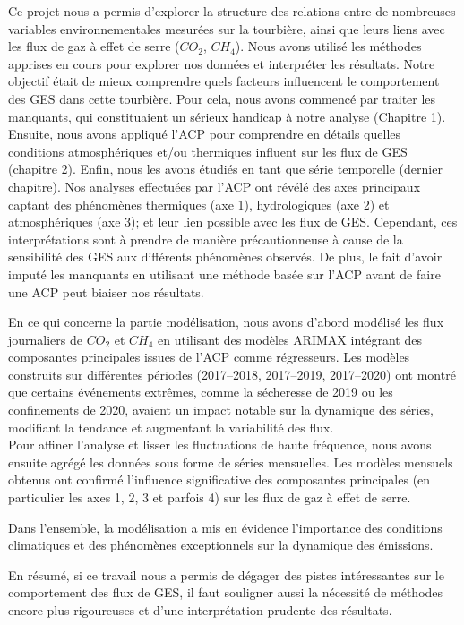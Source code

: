 \documentclass[a4paper,12pt]{report}%
\begin{document}
Ce projet nous a permis d’explorer la structure des relations entre de nombreuses variables environnementales mesurées sur la tourbière, ainsi que leurs liens avec les flux de gaz à effet de serre ($CO_2$, $CH_4$). 
Nous avons utilisé les méthodes apprises en cours pour explorer nos données et interpréter les résultats.
Notre objectif était de mieux comprendre quels facteurs influencent le comportement des GES dans cette tourbière.
Pour cela, nous avons commencé par traiter  les manquants, qui constituaient  un sérieux handicap à notre analyse (Chapitre 1). Ensuite, nous avons appliqué l'ACP pour comprendre en détails quelles conditions atmosphériques et/ou thermiques influent sur les flux de GES (chapitre 2). Enfin, nous les avons étudiés en tant que série temporelle (dernier chapitre). \newline
Nos analyses effectuées par l'ACP ont révélé des axes principaux captant des phénomènes thermiques (axe 1), hydrologiques (axe 2) et atmosphériques (axe 3); et leur lien possible avec les flux de GES. Cependant, ces interprétations sont à prendre de manière précautionneuse  à cause de la sensibilité des GES aux différents phénomènes observés. De plus, le fait d'avoir imputé les manquants en utilisant une méthode basée sur l'ACP avant de faire une ACP peut biaiser nos résultats.\newline

En ce qui concerne la partie modélisation, nous avons d’abord modélisé les flux journaliers de $CO_2$ et $CH_4$ en utilisant des modèles ARIMAX intégrant des composantes principales issues de l’ACP comme régresseurs.   Les modèles construits sur différentes périodes (2017–2018, 2017–2019, 2017–2020) ont montré que certains événements extrêmes, comme la sécheresse de 2019 ou les confinements de 2020, avaient un impact notable sur la dynamique des séries, modifiant la tendance et augmentant la variabilité des flux.\\
Pour affiner l’analyse et lisser les fluctuations de haute fréquence, nous avons ensuite agrégé les données sous forme de séries mensuelles. Les modèles mensuels obtenus ont confirmé l’influence significative des composantes principales (en particulier les axes 1, 2, 3 et parfois 4) sur les flux de gaz à effet de serre.\par  
Dans l’ensemble, la modélisation a mis en évidence l’importance des conditions climatiques et des phénomènes exceptionnels sur la dynamique des émissions.\par

En résumé, si ce travail nous a permis de dégager des pistes intéressantes sur le comportement des flux de GES, il faut souligner aussi la nécessité de méthodes encore plus rigoureuses et d'une interprétation prudente des résultats.
\end{document}
